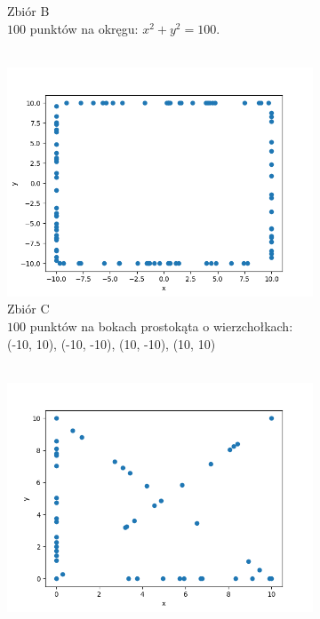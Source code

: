 \documentclass[11pt,a4paper]{article}
\begin{document}
\begin{figure}[H]
\begin{subfigure}[b]{0.46\textwidth}
        \caption{
            Zbiór B
            \\
            \footnotesize$100$ punktów na okręgu: $x^2 + y^2 = 100$.
            \\
            ~
        }
    \end{subfigure}
    \begin{subfigure}[b]{0.46\textwidth}
        \centering
        \includegraphics[scale=0.5]{res/points_c.png}
        \caption{
            Zbiór C
            \\
            \footnotesize$100$ punktów na bokach prostokąta
            o wierzchołkach:
            \\
            (-10, 10), (-10, -10), (10, -10), (10, 10)
            \\
            ~
        }
    \end{subfigure}
    \begin{subfigure}[b]{0.46\textwidth}
        \centering
        \includegraphics[scale=0.5]{res/points_d.png}

\end{subfigure}
\end{figure}
\end{document}
